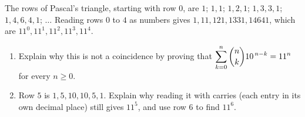 The rows of Pascal's triangle, starting with row $0$, are $1$; $1,1$; $1,2,1$; $1,3,3,1$; $1,4,6,4,1$; $\dots$ Reading rows $0$ to $4$ as numbers gives $1,11,121,1331,14641$, which are $11^0,11^1,11^2,11^3,11^4$.
\begin{enumerate}
\item[(a)] Explain why this is not a coincidence by proving that $\displaystyle\sum_{k=0}^{n}\dbinom nk10^{\,n-k}=11^n$ for every $n\ge0$.
\item[(b)] Row $5$ is $1,5,10,10,5,1$. Explain why reading it with carries (each entry in its own decimal place) still gives $11^5$, and use row $6$ to find $11^6$.
\end{enumerate}
